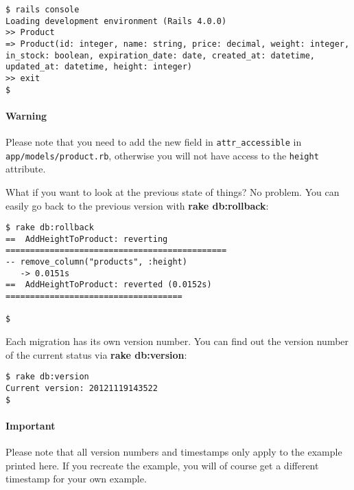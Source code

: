 \documentclass[a4paper]{book}
\begin{document}
\begin{shaded}\begin{verbatim}
$ rails console
Loading development environment (Rails 4.0.0)
>> Product
=> Product(id: integer, name: string, price: decimal, weight: integer, in_stock: boolean, expiration_date: date, created_at: datetime, updated_at: datetime, height: integer)
>> exit
$
\end{verbatim}\end{shaded}

\paragraph{Warning}\label{warning-9}

Please note that you need to add the new field in \texttt{attr\_accessible} in \texttt{app/models/product.rb}, otherwise you will not have access to the \texttt{height} attribute.

What if you want to look at the previous state of things? No problem. You can easily go back to the previous version with \textbf{rake db:rollback}:

\begin{shaded}\begin{verbatim}
$ rake db:rollback
==  AddHeightToProduct: reverting =============================================
-- remove_column("products", :height)
   -> 0.0151s
==  AddHeightToProduct: reverted (0.0152s) ====================================

$
\end{verbatim}\end{shaded}

Each migration has its own version number. You can find out the version number of the current status via \textbf{rake db:version}:

\begin{shaded}\begin{verbatim}
$ rake db:version
Current version: 20121119143522
$
\end{verbatim}\end{shaded}

\paragraph{Important}\label{important-10}

Please note that all version numbers and timestamps only apply to the example printed here. If you recreate the example, you will of course get a different timestamp for your own example.
\end{document}
